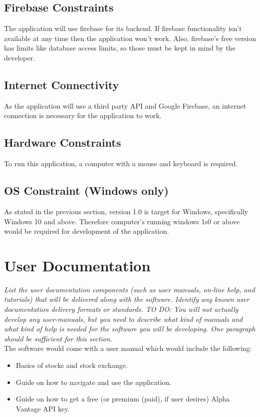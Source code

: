\documentclass[12 pt, a4paper]{report}
\begin{document}
	\subsection{Firebase Constraints}
	The application will use firebase for its backend. If firebase functionality isn't available at any time then the application won't work. Also, firebase's free version has limits like database access limits, so those must be kept in mind by the developer.
	
	\subsection{Internet Connectivity}
	As the application will use a third party API and Google Firebase, an internet connection is necessary for the application to work.
	
	\subsection{Hardware Constraints}
	To run this application, a computer with a mouse and keyboard is required.
	
	\subsection{OS Constraint (Windows only)}
	As stated in the previous section, version 1.0 is target for Windows, specifically Windows 10 and above. Therefore computer's running windows 1s0 or above would be required for development of the application.

	
	\section {User Documentation}
	\textit{List the user documentation components (such as user manuals, on-line help, and tutorials) that will be delivered along with the software. Identify any known user documentation delivery formats or standards. 
	TO DO: You will not actually develop any user-manuals, but you need to describe what kind of manuals and what kind of help is needed for the software you will be developing. One paragraph should be sufficient for this section.}\\
	The software would come with a user manual which would include the following:
	\begin{itemize}
		\item Basics of stocks and stock exchange.
		\item Guide on how to navigate and use the application.
		\item Guide on how to get a free (or premium (paid), if user desires) Alpha Vantage API key.
	\end{itemize}
	
\end{document}
